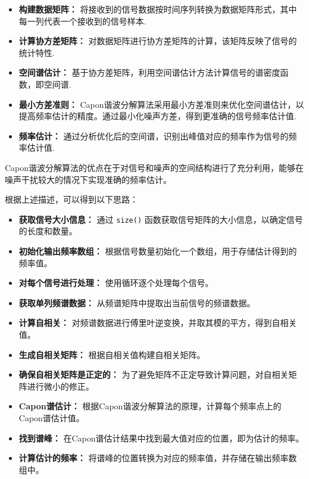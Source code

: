 \documentclass[a4paper,12pt]{article}
\begin{document}
\begin{itemize}
    \item \textbf{构建数据矩阵：} 将接收到的信号数据按时间序列转换为数据矩阵形式，其中每一列代表一个接收到的信号样本.
    \item \textbf{计算协方差矩阵：} 对数据矩阵进行协方差矩阵的计算，该矩阵反映了信号的统计特性.
    \item \textbf{空间谱估计：} 基于协方差矩阵，利用空间谱估计方法计算信号的谱密度函数，即空间谱.
    \item \textbf{最小方差准则：} Capon谐波分解算法采用最小方差准则来优化空间谱估计，以提高频率估计的精度。通过最小化噪声方差，得到更准确的信号频率估计值.
    \item \textbf{频率估计：} 通过分析优化后的空间谱，识别出峰值对应的频率作为信号的频率估计值.
\end{itemize}


Capon谐波分解算法的优点在于对信号和噪声的空间结构进行了充分利用，能够在噪声干扰较大的情况下实现准确的频率估计。

根据上述描述，可以得到以下思路：

\begin{itemize}
    \item \textbf{获取信号大小信息：} 通过 \texttt{size()} 函数获取信号矩阵的大小信息，以确定信号的长度和数量。
    
    \item \textbf{初始化输出频率数组：} 根据信号数量初始化一个数组，用于存储估计得到的频率值。
    
    \item \textbf{对每个信号进行处理：} 使用循环逐个处理每个信号。
    
    \item \textbf{获取单列频谱数据：} 从频谱矩阵中提取出当前信号的频谱数据。
    
    \item \textbf{计算自相关：} 对频谱数据进行傅里叶逆变换，并取其模的平方，得到自相关值。
    
    \item \textbf{生成自相关矩阵：} 根据自相关值构建自相关矩阵。
    
    \item \textbf{确保自相关矩阵是正定的：} 为了避免矩阵不正定导致计算问题，对自相关矩阵进行微小的修正。
    
    \item \textbf{Capon谱估计：} 根据Capon谐波分解算法的原理，计算每个频率点上的Capon谱估计值。
    
    \item \textbf{找到谱峰：} 在Capon谱估计结果中找到最大值对应的位置，即为估计的频率。
    
    \item \textbf{计算估计的频率：} 将谱峰的位置转换为对应的频率值，并存储在输出频率数组中。
\end{itemize}
\end{document}
